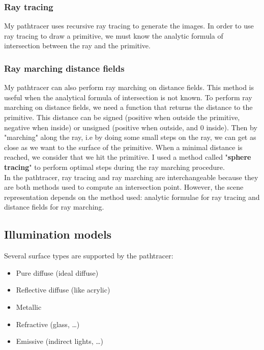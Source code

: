 \documentclass[a4paper,10pt]{article}
\begin{document}
\subsubsection{Ray tracing}

My pathtracer uses recursive ray tracing to generate the images. In order to use ray tracing to draw a primitive, we must know the analytic formula of intersection between the ray and the primitive.

\subsubsection{Ray marching distance fields}

My pathtracer can also perform ray marching on distance fields. This method is useful when the analytical formula of intersection is not known. To perform ray marching on distance fields, we need a function that returns the distance to the primitive. This distance can be signed (positive when outside the primitive, negative when inside) or unsigned (positive when outside, and 0 inside). Then by "marching" along the ray, i.e by doing some small steps on  the ray, we can get as close as we want to the surface of the primitive. When a minimal distance is reached, we consider that we hit the primitive. I used a method called "\textbf{sphere tracing}" to perform optimal steps during the ray marching procedure. \\

\noindent
In the pathtracer, ray tracing and ray marching are interchangeable because they are both methods used to compute an intersection point. However, the scene representation depends on the method used: analytic formulae for ray tracing and distance fields for ray marching.

\subsection{Illumination models}

Several surface types are supported by the pathtracer:
\begin{itemize}
	\item Pure diffuse (ideal diffuse)
	\item Reflective diffuse (like acrylic)
	\item Metallic
	\item Refractive (glass, \ldots)
	\item Emissive (indirect lights, \ldots)
\end{itemize}
\end{document}
